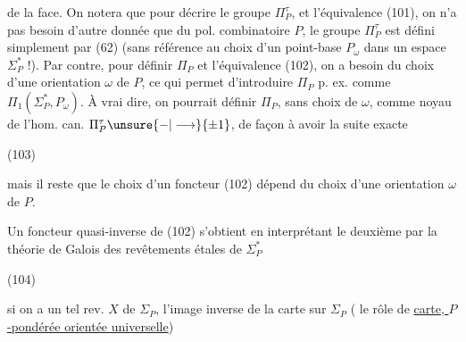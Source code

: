 de la face. On notera que pour décrire le groupe $\Pi_P^\tau$, et l'équivalence (101), on n'a pas besoin d'autre donnée que du pol. combinatoire $P$, le groupe $\Pi_P^\tau$ est défini simplement par (62) (sans référence au choix d'un point-base $P_\omega$ dans un espace $\Sigma_P^*$ !). Par contre, pour définir $\Pi_P$ et l'équivalence (102), on a besoin du choix d'une orientation $\omega$ de $P$, ce qui permet d'introduire $\Pi_P$ p. ex. comme $\Pi_1(\Sigma_P^*,P_\omega)$. À vrai dire, on pourrait définir $\Pi_P$, sans choix de $\omega$, comme noyau de l'hom. can. $\Pi_P^\tau\unsure{\mathbin{-}|\longrightarrow}\{\pm1\}$, de façon à avoir la suite exacte

(103)

mais il reste que le choix d'un foncteur (102) dépend du choix d'une orientation $\omega$ de $P$.

Un foncteur quasi-inverse de (102) s'obtient en interprétant le deuxième  par la théorie de Galois des revêtements étales de $\Sigma_P^*$

(104)

si on a un tel rev.  $X$ de $\Sigma_P$, l'image inverse de la carte   sur $\Sigma_P$ ( le rôle de \uline{carte, $P$-pondérée orientée universelle})

